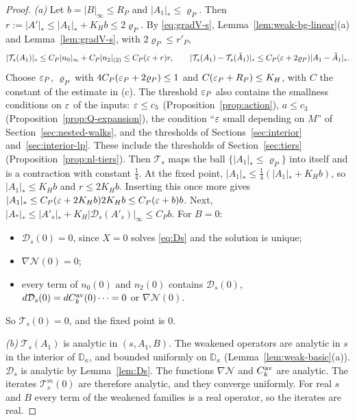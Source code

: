 \begin{proof}
\emph{(a)} Let $b=|B|_\infty\le R_P$ and $|A_1|_*\le\varrho_P$. Then $r:=|A'|_*\le|A_1|_*+K_Hb\le2\varrho_P$. By \eqref{eq:gradV-s}, Lemma~\ref{lem:weak-bg-linear}(a) and Lemma~\ref{lem:gradV-s}, with $2\varrho_P\le r'_P$,
\[
|\mathcal T_s(A_1)|_*\le C_P|n_0|_\infty+C_P|n_2|_{(2)}\le C_P(\varepsilon+r)r,\qquad|\mathcal T_s(A_1)-\mathcal T_s(\tilde A_1)|_*\le C_P(\varepsilon+2\varrho_P)|A_1-\tilde A_1|_* .
\]
Choose $\varepsilon_P$, $\varrho_P$ with $4C_P(\varepsilon_P+2\varrho_P)\le1$ and $C(\varepsilon_P+R_P)\le K_H$, with $C$ the constant of the estimate in (c). The threshold $\varepsilon_P$ also contains the smallness conditions on $\varepsilon$ of the inputs: $\varepsilon\le c_5$ (Proposition~\ref{prop:action}), $a\le c_3$ (Proposition~\ref{prop:Q-expansion}), the condition ``$\varepsilon$ small depending on $M$'' of Section~\ref{sec:nested-walks}, and the thresholds of Sections~\ref{sec:interior} and~\ref{sec:interior-lp}. These include the thresholds of Section~\ref{sec:tiers} (Proposition~\ref{prop:nl-tiers}). Then $\mathcal T_s$ maps the ball $\{|A_1|_*\le\varrho_P\}$ into itself and is a contraction with constant $\frac14$. At the fixed point, $|A_1|_*\le\frac14(|A_1|_*+K_Hb)$, so $|A_1|_*\le K_Hb$ and $r\le2K_Hb$. Inserting this once more gives $|A_1|_*\le C_P(\varepsilon+2K_Hb)2K_Hb\le C_P(\varepsilon+b)b$. Next, $|A_*|_*\le|A'_s|_*+K_H|\mathcal D_s(A'_s)|_\infty\le C_Pb$. For $B=0$:
\begin{itemize}
\item $\mathcal D_s(0)=0$, since $X=0$ solves \eqref{eq:Ds} and the solution is unique;
\item $\nabla\mathcal N(0)=0$;
\item every term of $n_0(0)$ and $n_2(0)$ contains $\mathcal D_s(0)$, $d\mathcal D_s(0)=dC^{\rm av}_k(0)\cdots=0$ or $\nabla\mathcal N(0)$.
\end{itemize}
So $\mathcal T_s(0)=0$, and the fixed point is $0$.

\emph{(b)} $\mathcal T_s(A_1)$ is analytic in $(s,A_1,B)$. The weakened operators are analytic in $s$ in the interior of $\mathbb D_\kappa$, and bounded uniformly on $\mathbb D_\kappa$ (Lemma~\ref{lem:weak-basic}(a)). $\mathcal D_s$ is analytic by Lemma~\ref{lem:Ds}. The functions $\nabla\mathcal N$ and $C^{\rm av}_k$ are analytic. The iterates $\mathcal T_s^m(0)$ are therefore analytic, and they converge uniformly. For real $s$ and $B$ every term of the weakened families is a real operator, so the iterates are real.


\end{proof}

